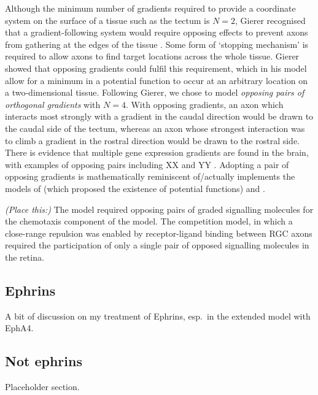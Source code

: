 \documentclass[11pt, a4paper]{article}
\begin{document}
Although the minimum number of gradients required to provide a coordinate system on the surface of a tissue such as the tectum is $N=2$, Gierer recognised that a gradient-following system would require opposing effects to prevent axons from gathering at the edges of the tissue \citep{gierer_model_1983}. 
Some form of `stopping mechanism' is required to allow axons to find target locations across the whole tissue. Gierer showed that opposing gradients could fulfil this requirement, which in his model allow for a minimum in a potential function to occur at an arbitrary location on a two-dimensional tissue.
Following Gierer, we chose to model \emph{opposing pairs of orthogonal gradients} with $N=4$.
With opposing gradients, an axon which interacts most strongly with a gradient in the caudal direction would be drawn to the caudal side of the tectum, whereas an axon whose strongest interaction was to climb a gradient in the rostral direction would be drawn to the rostral side. 
There is evidence that multiple gene expression gradients are found in the brain, with examples of opposing pairs including XX and YY \citep{cang_developmental_2013}. 
Adopting a pair of opposing gradients is mathematically reminiscent of/actually implements the models of \citet{gierer_model_1983} (which proposed the existence of potential functions) and \citet{fraser_differential_1980}.

\emph{(Place this:)} The model required opposing pairs of graded signalling molecules for the chemotaxis component of the model.
The competition model, in which a close-range repulsion was enabled by receptor-ligand binding between RGC axons required the participation of only a single pair of opposed signalling molecules in the retina.

\subsection*{Ephrins}
A bit of discussion on my treatment of Ephrins, esp.~in the extended model with EphA4.

\subsection*{Not ephrins}

Placeholder section.
\end{document}
